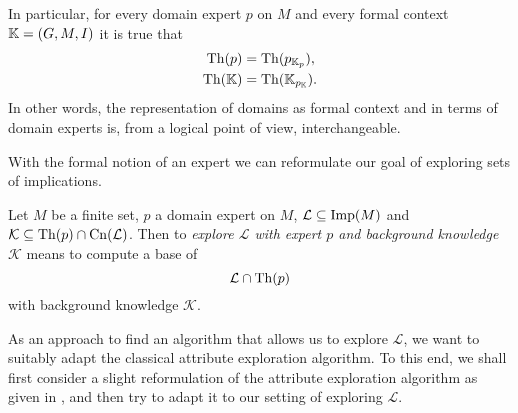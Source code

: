 In particular, for every domain expert $p$ on $M$ and every formal context ${\mathbb{K}} = (G,
M, I)$ it is true that
\begin{align*}
  \operatorname{Th}(p) &= \operatorname{Th}(p_{{\mathbb{K}}_p}), \\
  \operatorname{Th}({\mathbb{K}}) &= \operatorname{Th}({\mathbb{K}}_{p_{{\mathbb{K}}}}).
\end{align*}
In other words, the representation of domains as formal context and in terms of domain
experts is, from a logical point of view, interchangeable.

With the formal notion of an expert we can reformulate our goal of exploring sets of
implications.

\begin{Definition}
  \label{def:exploring-sets-of-implications}
  Let $M$ be a finite set, $p$ a domain expert on $M$, $\mathcal{L} \subseteq \operatorname{Imp}(M)$ and
  $\mathcal{K} \subseteq \operatorname{Th}(p) \cap \operatorname{Cn}(\mathcal{L})$.  Then to \emph{explore
    $\mathcal{L}$ with expert $p$ and background knowledge $\mathcal{K}$} means to compute
  a base of
  \begin{equation*}
    \mathcal{L} \cap \operatorname{Th}(p)
  \end{equation*}
  with background knowledge $\mathcal{K}$.
\end{Definition}

As an approach to find an algorithm that allows us to explore $\mathcal{L}$, we want to
suitably adapt the classical attribute exploration algorithm.  To this end, we shall first
consider a slight reformulation of the attribute exploration algorithm as given in
, and then try to adapt it to our setting of exploring
$\mathcal{L}$.


